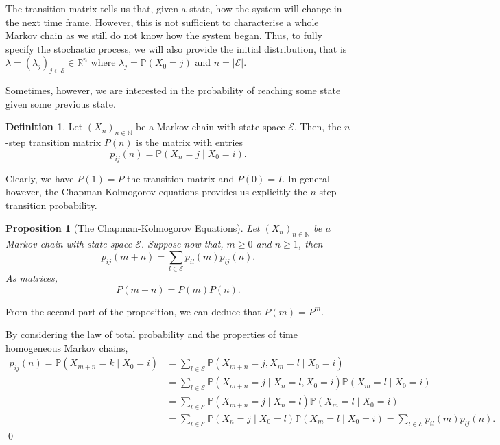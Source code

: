 \documentclass[
]{article}
\newtheorem{prop}{Proposition}[theorem]
\theoremstyle{definition}
\newtheorem{definition}{Definition}[section]
\begin{document}
The transition matrix tells us that, given a state, how the system will
change in the next time frame. However, this is not sufficient to
characterise a whole Markov chain as we still do not know how the system
began. Thus, to fully specify the stochastic process, we will also
provide the initial distribution, that is
\(\lambda = (\lambda_j)_{j \in \mathcal{E}} \in \mathbb{R}^n\) where
\(\lambda_j = \mathbb{P}(X_0 = j)\) and
\(n = \left| \mathcal{E} \right|\).

Sometimes, however, we are interested in the probability of reaching
some state given some previous state.

\begin{definition}
  Let \((X_n)_{n \in \mathbb{N}}\) be a Markov chain with state space \(\mathcal{E}\).
  Then, the \(n\)-step transition matrix \(P(n)\) is the matrix with entries 
  \[p_{ij}(n) = \mathbb{P}(X_n = j \mid X_0 = i).\]
\end{definition}

Clearly, we have \(P(1) = P\) the transition matrix and \(P(0) = I\). In
general however, the Chapman-Kolmogorov equations provides us explicitly
the \(n\)-step transition probability.

\begin{prop}[The Chapman-Kolmogorov Equations]
  Let \((X_n)_{n \in \mathbb{N}}\) be a Markov chain with state space \(\mathcal{E}\). 
  Suppose now that, \(m \ge 0\) and \(n \ge 1\), then 
  \[p_{ij}(m + n) = \sum_{l \in \mathcal{E}}p_{il}(m)p_{lj}(n).\]
  As matrices,
  \[P(m + n) = P(m) P(n).\] 
\end{prop}

From the second part of the proposition, we can deduce that
\(P(m) = P^m\).

\proof

By considering the law of total probability and the properties of time
homogeneous Markov chains, \begin{align*}
    p_{ij}(n) = \mathbb{P}(X_{m + n} = k \mid X_0 = i) & = 
      \sum_{l \in \mathcal{E}} \mathbb{P}(X_{m + n} = j, X_m = l \mid X_0 = i)\\
    & = \sum_{l \in \mathcal{E}} \mathbb{P}(X_{m + n} = j \mid X_n = l, X_0 = i)
      \mathbb{P}(X_m = l \mid X_0 = i)\\
    & = \sum_{l \in \mathcal{E}} \mathbb{P}(X_{m + n} = j \mid X_n = l)
      \mathbb{P}(X_m = l \mid X_0 = i)\\
    & = \sum_{l \in \mathcal{E}}\mathbb{P}(X_ n = j \mid X_0 = l) 
      \mathbb{P}(X_m = l \mid X_0 = i) = \sum_{l \in \mathcal{E}}p_{il}(m)p_{lj}(n).
  \end{align*} \qed
\end{document}

